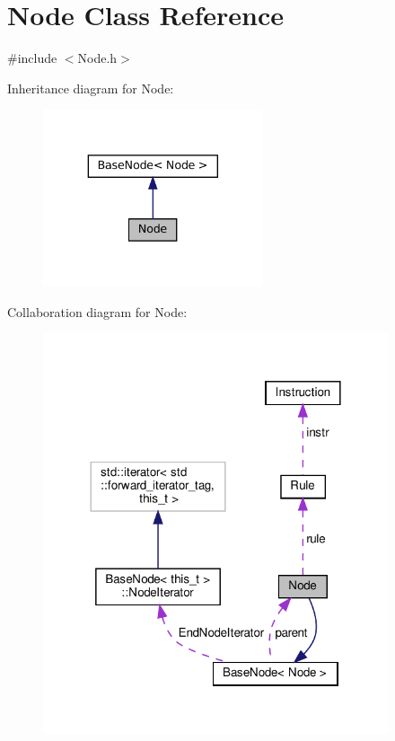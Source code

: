 \hypertarget{class_node}{}\section{Node Class Reference}
\label{class_node}


{\ttfamily \#include $<$Node.\+h$>$}



Inheritance diagram for Node\+:
\nopagebreak
\begin{figure}[H]
\begin{center}
\leavevmode
\includegraphics[width=184pt]{class_node__inherit__graph}
\end{center}
\end{figure}


Collaboration diagram for Node\+:
\nopagebreak
\begin{figure}[H]
\begin{center}
\leavevmode
\includegraphics[width=288pt]{class_node__coll__graph}
\end{center}
\end{figure}
